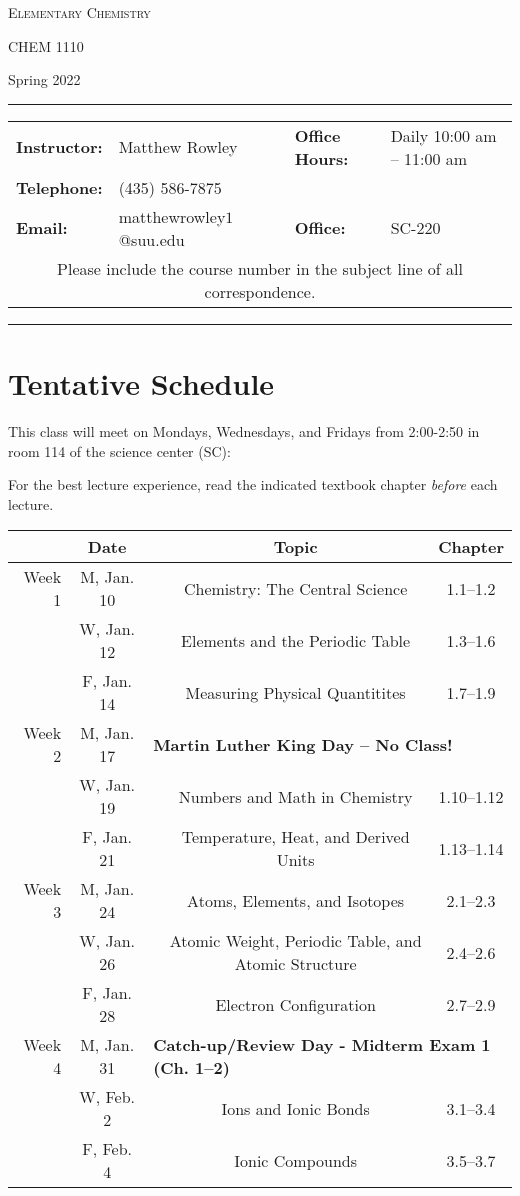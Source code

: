\documentclass[12pt, letterpaper]{article}
\begin{document}
\begin{center}
	{\Large \textsc{Elementary Chemistry}}
	
	CHEM 1110
\end{center}
\begin{center}
	{\large Spring 2022}
\end{center}
\begin{center}
	\rule{0.99\textwidth}{0.4pt}
	\begin{tabular}{llcll}
		\textbf{Instructor:} & Matthew Rowley & & \textbf{Office Hours:} & Daily 10:00 am -- 11:00 am \\
		\textbf{Telephone:} & (435) 586-7875 & & & \\
		\textbf{Email:} & matthewrowley$1$@suu.edu  & & \textbf{Office:} & SC-220\\
		\multicolumn{5}{c}{Please include the course number in the subject line of all correspondence.} 
	\end{tabular}
	\rule{0.99\textwidth}{0.4pt}
\end{center}

\section*{Tentative Schedule}
This class will meet on Mondays, Wednesdays, and Fridays from 2:00-2:50 in room 114 of the science center (SC):

\noindent For the best lecture experience, read the indicated textbook chapter \emph{before} each lecture.

\noindent
\begin{tabular}{rcccc}
	& Date && Topic & Chapter\\
	\midrule
	Week 1 & M, Jan. 10&& Chemistry: The Central Science & 1.1--1.2\\
	& W, Jan. 12&& Elements and the Periodic Table & 1.3--1.6\\
	& F, Jan. 14&& Measuring Physical Quantitites & 1.7--1.9\\
	\midrule
	Week 2 & M, Jan. 17& \multicolumn{3}{l}{\textbf{Martin Luther King Day -- No Class!}}\\
	& W, Jan. 19&& Numbers and Math in Chemistry & 1.10--1.12\\
	& F, Jan. 21&& Temperature, Heat, and Derived Units & 1.13--1.14\\
	\midrule
	Week 3 & M, Jan. 24&& Atoms, Elements, and Isotopes & 2.1--2.3\\
	& W, Jan. 26&& Atomic Weight, Periodic Table, and Atomic Structure & 2.4--2.6\\
	& F, Jan. 28&& Electron Configuration & 2.7--2.9\\
	\midrule
	Week 4 & M, Jan. 31& \multicolumn{3}{l}{\textbf{Catch-up/Review Day - Midterm Exam 1 (Ch. 1--2)}}\\
	& W, Feb. 2&& Ions and Ionic Bonds & 3.1--3.4\\
	& F, Feb. 4&& Ionic Compounds & 3.5--3.7\\
\end{tabular}
\end{document}
